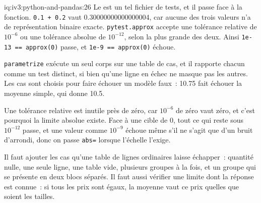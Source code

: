 \begin{solution}{iq:iv3:python-and-pandas:26}
Le  est un tel fichier de tests, et il passe face à la fonction. \texttt{0.1 + 0.2} vaut 0.30000000000000004, car aucune des trois valeurs n'a de représentation binaire exacte. \texttt{pytest.approx} accepte une tolérance relative de $10^{-6}$ ou une tolérance absolue de $10^{-12}$, selon la plus grande des deux. Ainsi \texttt{1e-13 == approx(0)} passe, et \texttt{1e-9 == approx(0)} échoue.
\label{lst:iv3:pp:checks}

\texttt{parametrize} exécute un seul corps sur une table de cas, et il rapporte chacun comme un test distinct, si bien qu'une ligne en échec ne masque pas les autres. Les cas sont choisis pour faire échouer un modèle faux~: 10.75 fait échouer la moyenne simple, qui donne 10.5.

Une tolérance relative est inutile près de zéro, car $10^{-6}$ de zéro vaut zéro, et c'est pourquoi la limite absolue existe. Face à une cible de 0, tout ce qui reste sous $10^{-12}$ passe, et une valeur comme $10^{-9}$ échoue même s'il ne s'agit que d'un bruit d'arrondi, donc on passe \texttt{abs=} lorsque l'échelle l'exige.

Il faut ajouter les cas qu'une table de lignes ordinaires laisse échapper~: quantité nulle, une seule ligne, une table vide, plusieurs groupes à la fois, et un groupe qui se présente en deux blocs séparés. Il faut aussi vérifier une limite dont la réponse est connue~: si tous les prix sont égaux, la moyenne vaut ce prix quelles que soient les tailles.

\end{solution}

